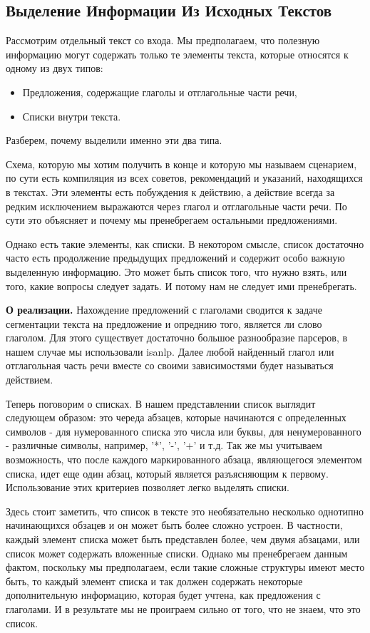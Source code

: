 \documentclass[12pt]{article}
\begin{document}
\subsection{Выделение Информации Из Исходных Текстов}
\label{marker2}

Рассмотрим отдельный текст со входа. Мы предполагаем, что полезную информацию могут содержать только те элементы текста, которые относятся к одному из двух типов:

\begin{itemize}
	\item Предложения, содержащие глаголы и отглагольные части речи,
	\item Списки внутри текста.
\end{itemize} 

Разберем, почему выделили именно эти два типа.

Схема, которую мы хотим получить в конце и которую мы называем сценарием, по сути есть компиляция из всех советов, рекомендаций и указаний, находящихся в текстах. Эти элементы есть побуждения к действию, а действие всегда за редким исключением выражаются через глагол и отглагольные части речи. По сути это объясняет и почему мы пренебрегаем остальными предложениями.

Однако есть такие элементы, как списки. В некотором смысле, список достаточно часто есть продолжение предыдущих предложений и содержит особо важную выделенную информацию. Это может быть список того, что нужно взять, или того, какие вопросы следует задать. И потому нам не следует ими пренебрегать.

\textbf{О реализации.} Нахождение предложений с глаголами сводится к задаче сегментации текста на предложение и опреднию того, является ли слово глаголом. Для этого существует достаточно большое разнообразие парсеров, в нашем случае мы использовали isanlp. Далее любой найденный глагол или отглагольная часть речи вместе со своими зависимостями будет называться действием.

Теперь поговорим о списках. В нашем представлении список выглядит следующем образом: это череда абзацев, которые начинаются с определенных символов - для нумерованного списка это числа или буквы, для ненумерованного - различные символы, например, '*', '-', '+' и т.д. Так же мы учитываем возможность, что после каждого маркированного абзаца, являющегося элементом списка, идет еще один абзац, который является разъясняющим к первому. Использование этих критериев позволяет легко выделять списки.

Здесь стоит заметить, что список в тексте это необязательно несколько однотипно начинающихся обзацев и он может быть более сложно устроен. В частности, каждый элемент списка может быть представлен более, чем двумя абзацами, или список может содержать вложенные списки. Однако мы пренебрегаем данным фактом, поскольку мы предполагаем, если такие сложные структуры имеют место быть, то каждый элемент списка и так должен содержать некоторые дополнительную информацию, которая будет учтена, как предложения с глаголами. И в результате мы не проиграем сильно от того, что не знаем, что это список.
\end{document}
